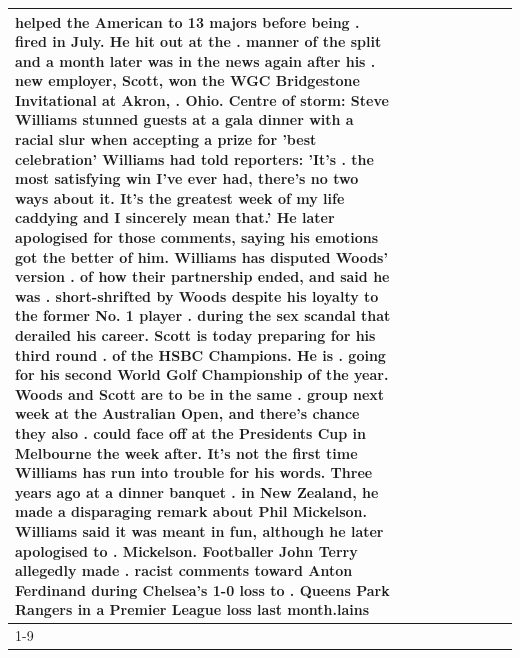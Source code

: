 \begin{table}[H]
\begin{tabular}{lllrlllll}
helped the American to 13 majors before being . fired in July. He hit out at the . manner of the split and a month later was in the news again after his . new employer, Scott, won the WGC Bridgestone Invitational at Akron, . Ohio. Centre of storm: Steve Williams stunned guests at a gala dinner with a racial slur when accepting a prize for 'best celebration' Williams had told reporters: 'It's . the most satisfying win I've ever had, there's no two ways about it. It's the greatest week of my life caddying and I sincerely mean that.' He later apologised for those comments, saying his emotions got the better of him. Williams has disputed Woods' version . of how their partnership ended, and said he was . short-shrifted by Woods despite his loyalty to the former No. 1 player . during the sex scandal that derailed his career. Scott is today preparing for his third round . of the HSBC Champions. He is . going for his second World Golf Championship of the year. Woods and Scott are to be in the same . group next week at the Australian Open, and there's chance they also . could face off at the Presidents Cup in Melbourne the week after. It's not the first time Williams has run into trouble for his words. Three years ago at a dinner banquet . in New Zealand, he made a disparaging remark about Phil Mickelson. Williams said it was meant in fun, although he later apologised to . Mickelson. Footballer John Terry allegedly made . racist comments toward Anton Ferdinand during Chelsea's 1-0 loss to . Queens Park Rangers in a Premier League loss last month.lains \\
\cline{1-9}

\end{tabular}
\end{table}
